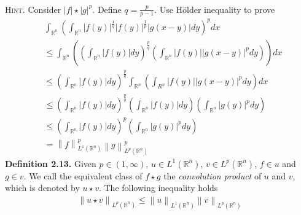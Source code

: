 \documentclass[a4paper]{article}
\numberwithin{equation}{section}
\begin{document}
\\
\textsc{Hint.} Consider $\left| f \right|\star {\left| g \right|^p}$. Define $q = \frac{p}{{p - 1}}$. Use H\"{o}lder inequality to prove
\begin{align}
&\int_{{\mathbb{R}^n}} {{{\left( {\int_{{\mathbb{R}^n}} {{{\left| {f\left( y \right)} \right|}^{\frac{1}{q}}}{{\left| {f\left( y \right)} \right|}^{\frac{1}{p}}}\left| {g\left( {x - y} \right)} \right|dy} } \right)}^p}dx} \\
& \le \int_{{\mathbb{R}^n}} {\left( {{{\left( {\int_{{\mathbb{R}^n}} {\left| {f\left( y \right)} \right|dy} } \right)}^{\frac{p}{q}}}\left( {\int_{{\mathbb{R}^n}} {\left| {f\left( y \right)} \right|{{\left| {g\left( {x - y} \right)} \right|}^p}dy} } \right)} \right)dx} \\
& \le {\left( {\int_{{\mathbb{R}^n}} {\left| {f\left( y \right)} \right|dy} } \right)^{\frac{p}{q}}}\int_{{\mathbb{R}^n}} {\left( {\int_{{R^n}} {\left| {f\left( y \right)} \right|{{\left| {g\left( {x - y} \right)} \right|}^p}dy} } \right)dx} \\
& \le {\left( {\int_{{\mathbb{R}^n}} {\left| {f\left( y \right)} \right|dy} } \right)^{\frac{p}{q}}}\left( {\int_{{\mathbb{R}^n}} {\left| {f\left( y \right)} \right|dy} } \right)\left( {\int_{{\mathbb{R}^n}} {{{\left| {g\left( y \right)} \right|}^p}dy} } \right)\\
 &\le {\left( {\int_{{\mathbb{R}^n}} {\left| {f\left( y \right)} \right|dy} } \right)^p}\left( {\int_{{\mathbb{R}^n}} {{{\left| {g\left( y \right)} \right|}^p}dy} } \right)\\
 &= \left\| f \right\|_{{L^1}\left( {{\mathbb{R}^n}} \right)}^p\left\| g \right\|_{{L^p}\left( {{\mathbb{R}^n}} \right)}^p
\end{align}
\textbf{Definition 2.13.} Given $p\in \left(1,\infty\right)$, $u\in L^1\left(\mathbb{R}^n\right)$, $v\in L^p\left(\mathbb{R}^n\right)$, $f\in u$ and $g\in v$. We call the equivalent class of $f\star g$ the \textit{convolution product} of $u$ and $v$, which is denoted by $u\star v$. The following inequality holds
\begin{align}
{\left\| {u\star v} \right\|_{{L^p}\left( {{\mathbb{R}^n}} \right)}} \le {\left\| u \right\|_{{L^1}\left( {{\mathbb{R}^n}} \right)}}{\left\| v \right\|_{{L^p}\left( {{\mathbb{R}^n}} \right)}}
\end{align}
\end{document}
